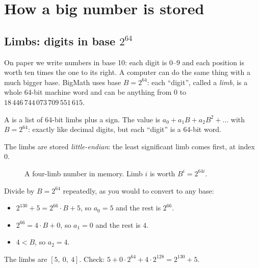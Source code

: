 \chapter{How a big number is stored}
\label{ch:repr}

\section{Limbs: digits in base $2^{64}$}

On paper we write numbers in base 10: each digit is $0$--$9$ and each position is
worth ten times the one to its right. A computer can do the same thing with a much
bigger base. BigMath uses base $B = 2^{64}$: each ``digit'', called a \emph{limb}, is a
whole 64-bit machine word and can be anything from $0$ to
$18\,446\,744\,073\,709\,551\,615$.

\begin{keyidea}
A  is a list of 64-bit limbs plus a sign. The value is
$a_0 + a_1 B + a_2 B^2 + \dots$ with $B = 2^{64}$: exactly like decimal digits, but each
``digit'' is a 64-bit word.
\end{keyidea}

The limbs are stored \emph{little-endian}: the least significant limb comes first,
at index 0.

\begin{figure}[ht]
\centering
{}
\caption{A four-limb number in memory. Limb $i$ is worth $B^i = 2^{64 i}$.}
\label{fig:limbs}
\end{figure}

\begin{example}
Divide by $B = 2^{64}$ repeatedly, as you would to convert to any base:
\begin{itemize}
  \item $2^{130} + 5 = 2^{66}\cdot B + 5$, so $a_0 = 5$ and the rest is $2^{66}$.
  \item $2^{66} = 4 \cdot B + 0$, so $a_1 = 0$ and the rest is $4$.
  \item $4 < B$, so $a_2 = 4$.
\end{itemize}
The limbs are $[5,\ 0,\ 4]$. Check: $5 + 0\cdot 2^{64} + 4 \cdot 2^{128} = 2^{130} + 5$.
\end{example}

